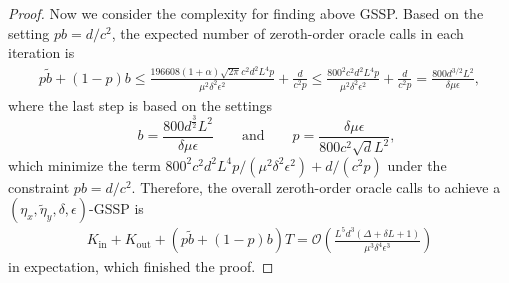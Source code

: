 \documentclass[11pt]{article}
\def\fO{{\mathcal{O}}}
\begin{document}
\begin{proof}
Now we consider the complexity for finding above GSSP.
Based on the setting $pb= d/c^2$, the expected number of zeroth-order oracle calls in each iteration is 
\begin{align*}
p\tilde{b}+(1-p)b\le 
\frac{196608(1+\alpha)\sqrt{2\pi }c^2d^2L^4p}{\mu^2\delta^2\epsilon^2}+\frac{d}{c^2p} 
\le 
\frac{800^2c^2d^2L^4p}{\mu^2\delta^2\epsilon^2}+\frac{d}{c^2p}
= \frac{800d^{{3}/{2}}L^2}{\delta\mu\epsilon},
\end{align*}
where the last step is based on the settings
\[\quad b=\frac{800d^{\frac{3}{2}}L^2}{\delta\mu\epsilon}
\qquad \text{and}\qquad p=\frac{\delta\mu\epsilon}{800c^2\sqrt{d}L^2},\]
which minimize the term ${800^2c^2d^2L^4p}/{(\mu^2\delta^2\epsilon^2)}+{d}/{(c^2p)}$ under the constraint $pb=d/c^2$.
Therefore, the overall zeroth-order oracle calls to achieve a $(\eta_x,\tilde{\eta}_y,\delta,\epsilon)$-GSSP is
\begin{align*}
K_{\mathrm{in}} + K_{\mathrm{out}}+ (p\tilde{b}+(1-p)b)T
= \fO\left(\frac{L^5 d^{3}(
 \Delta+\delta L+1)}{\mu^3 \delta^4 \epsilon^3}\right)
\end{align*}
in expectation, which finished the proof.

\end{proof}
\end{document}
